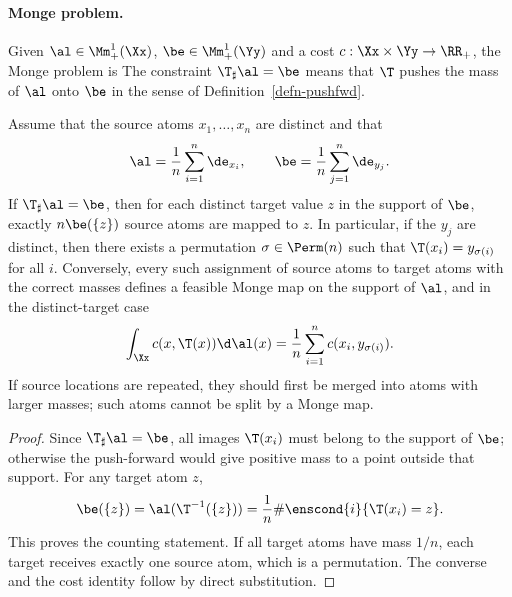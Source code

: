 \paragraph{Monge problem.}

Given $\al\in\Mm_+^1(\Xx)$, $\be\in\Mm_+^1(\Yy)$ and a cost $c:\Xx\times\Yy\to\RR_+$, the Monge problem is
The constraint $\T_\sharp\al=\be$ means that $\T$ pushes the mass of $\al$ onto $\be$ in the sense of Definition~\ref{defn-pushfwd}.

\begin{prop}\label{prop-empirical-monge-matching}
	Assume that the source atoms $x_1,\ldots,x_n$ are distinct and that
	\[
		\al=\frac1n\sum_{i=1}^n\de_{x_i},
		\qquad
		\be=\frac1n\sum_{j=1}^n\de_{y_j}.
	\]
	If $\T_\sharp\al=\be$, then for each distinct target value $z$ in the support of $\be$, exactly $n\be(\{z\})$ source atoms are mapped to $z$. In particular, if the $y_j$ are distinct, then there exists a permutation $\sigma\in\Perm(n)$ such that $\T(x_i)=y_{\sigma(i)}$ for all $i$. Conversely, every such assignment of source atoms to target atoms with the correct masses defines a feasible Monge map on the support of $\al$, and in the distinct-target case
	\[
		\int_\Xx c(x,\T(x))\d\al(x)=\frac1n\sum_{i=1}^n c(x_i,y_{\sigma(i)}).
	\]
	If source locations are repeated, they should first be merged into atoms with larger masses; such atoms cannot be split by a Monge map.
\end{prop}
\begin{proof}
	Since $\T_\sharp\al=\be$, all images $\T(x_i)$ must belong to the support of $\be$; otherwise the push-forward would give positive mass to a point outside that support. For any target atom $z$,
	\[
		\be(\{z\})=\al(\T^{-1}(\{z\}))=\frac1n\#\enscond{i}{\T(x_i)=z}.
	\]
	This proves the counting statement. If all target atoms have mass $1/n$, each target receives exactly one source atom, which is a permutation. The converse and the cost identity follow by direct substitution.
\end{proof}

